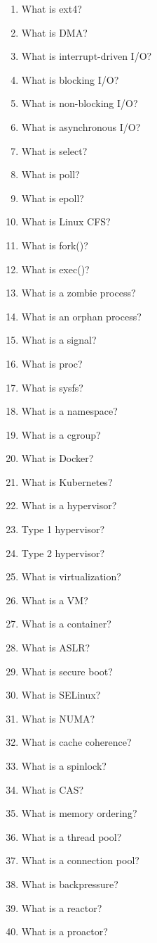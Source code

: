 \begin{enumerate}
\item What is ext4?
\item What is DMA?
\item What is interrupt-driven I/O?
\item What is blocking I/O?
\item What is non-blocking I/O?
\item What is asynchronous I/O?
\item What is select?
\item What is poll?
\item What is epoll?
\item What is Linux CFS?
\item What is fork()?
\item What is exec()?
\item What is a zombie process?
\item What is an orphan process?
\item What is a signal?
\item What is proc?
\item What is sysfs?
\item What is a namespace?
\item What is a cgroup?
\item What is Docker?
\item What is Kubernetes?
\item What is a hypervisor?
\item Type 1 hypervisor?
\item Type 2 hypervisor?
\item What is virtualization?
\item What is a VM?
\item What is a container?
\item What is ASLR?
\item What is secure boot?
\item What is SELinux?
\item What is NUMA?
\item What is cache coherence?
\item What is a spinlock?
\item What is CAS?
\item What is memory ordering?
\item What is a thread pool?
\item What is a connection pool?
\item What is backpressure?
\item What is a reactor?
\item What is a proactor?

\end{enumerate}

